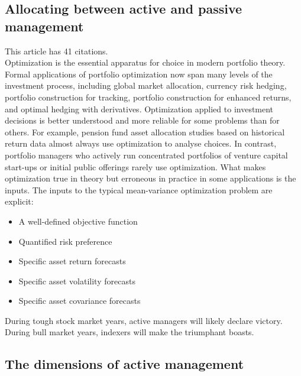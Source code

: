 \documentclass[12 pt]{article}
\begin{document}
\subsection{Allocating between active and passive management}
This article has 41 citations.\\
Optimization is the essential apparatus for choice in modern portfolio theory. Formal applications of portfolio optimization now span many levels of the investment process, including global market allocation, currency risk hedging, portfolio construction for tracking, portfolio construction for enhanced returns, and optimal hedging with derivatives. Optimization applied to investment decisions is better understood and more reliable for some problems than for others. For example, pension fund asset allocation studies based on historical return data almost always use optimization to analyse choices. In contrast, portfolio managers who actively run concentrated portfolios of venture capital start-ups or initial public offerings rarely use optimization. What makes optimization true in theory but erroneous in practice in some applications is the inputs.
The inputs to the typical mean-variance optimization problem are explicit:
\begin{itemize}
\item A well-defined objective function
\item Quantified risk preference
\item Specific asset return forecasts
\item Specific asset volatility forecasts
\item Specific asset covariance forecasts
\end{itemize}	
During tough stock market years, active managers will likely declare victory. During bull market years, indexers will make the triumphant boasts.
\subsection{The dimensions of active management}
\end{document}

